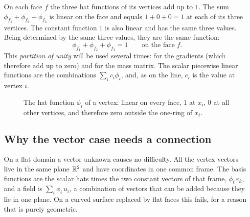On each face $f$ the three hat functions of its vertices add up to $1$. The sum $\phi_{f_1} + \phi_{f_2} + \phi_{f_3}$ is linear on the face and equals $1 + 0 + 0 = 1$ at each of its three vertices. The constant function $1$ is also linear and has the same three values. Being determined by the same three values, they are the same function:
\begin{equation*}
\phi_{f_1} + \phi_{f_2} + \phi_{f_3} = 1 \qquad \text{on the face } f .
\end{equation*}
This \emph{partition of unity} will be used several times: for the gradients (which therefore add up to zero) and for the mass matrix. The scalar piecewise linear functions are the combinations $\sum_i c_i \phi_i$, and, as on the line, $c_i$ is the value at vertex $i$.
\begin{figure}[t]
\centering
{}
\caption{The hat function $\phi_i$ of a vertex: linear on every face, $1$ at $x_i$, $0$ at all other vertices, and therefore zero outside the one-ring of $x_i$.}
\label{fig:hat}
\end{figure}

\subsection{Why the vector case needs a connection}

On a flat domain a vector unknown causes no difficulty. All the vertex vectors live in the same plane $\mathbb{R}^2$ and have coordinates in one common frame. The basis functions are the scalar hats times the two constant vectors of that frame, $\phi_i\, \varepsilon_k$, and a field is $\sum_i \phi_i\, u_i$, a combination of vectors that can be added because they lie in one plane. On a curved surface replaced by flat faces this fails, for a reason that is purely geometric.

